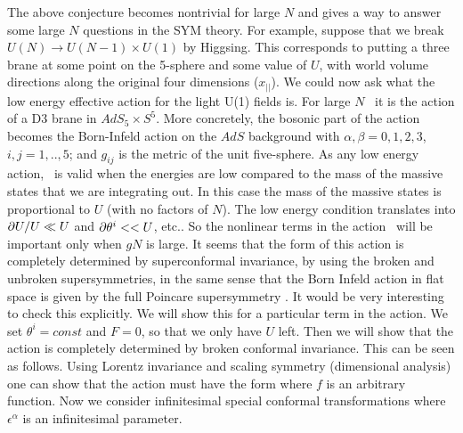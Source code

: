 The above conjecture   becomes nontrivial for large $N$ and gives a way to 
answer some large $N$ questions  in the SYM theory.
For example, suppose that we break $U(N) \to U(N-1) \times U(1)$ by
Higgsing. This corresponds to putting a three brane 
at some point on the 5-sphere and some value of $U$, with world volume
directions  along the original four dimensions ($x_{||}$). 
We  could now  ask what  the low energy effective action 
for the light U(1) fields is.
For large $N$ \sugra\ 
 it is the action of a D3 brane in $AdS_5 \times S^5$.
More concretely,  the bosonic part of the action becomes
the Born-Infeld action on the $AdS$ background 
\eqn{}
with $\alpha, \beta = 0,1,2,3$, $i,j = 1,..,5$; and 
   $g_{ij} $ is the metric
of the unit five-sphere. 
As any low energy action, \probeaction\ is valid when the energies are
low compared to the mass of the  massive states that we are
integrating out. In this case the mass of the massive states is
proportional
to $U$ (with no factors of $N$). 
The low energy condition translates into $\partial U /U \ll U$
and $\partial \theta^i << U $, etc.. So the nonlinear terms in the action 
\probeaction\
will be important only when $gN$ is large. 
It seems  that the form of this action is 
completely determined by superconformal invariance, by using the broken 
and unbroken supersymmetries, in the same sense that
the Born Infeld action in flat space is given by the full Poincare
supersymmetry \schwarz .  It would be very interesting to check this 
explicitly.
We will show this for a particular term in the action.
We set $\theta^i =
 const$
and $F = 0$, so that we only have $U$ left. Then we will show that 
the action is 
completely determined by 
broken conformal invariance. 
This can be seen as follows.
Using Lorentz invariance and scaling symmetry (dimensional analysis) 
one can show that the action must  have the form
\eqn\probegen{
S = \int d^{p+1}x U^{p+1} f( \p_\alpha U \p^\alpha U/U^4) ~,
}
where $f$ is an arbitrary function.
Now we consider  infinitesimal  special conformal transformations
\eqn\espconf{\eqalign{
\delta x^\alpha  &= \epsilon^\beta x_\beta  x^\alpha -
\epsilon^\alpha ( x^2 + { \tilde R^4 \over U^2 })/2 ~, \cr
\delta U & \equiv U'(x') -U(x)   = - \epsilon^\alpha x_\alpha U ~,
}}
where $\epsilon^\alpha$ is an infinitesimal parameter. 
